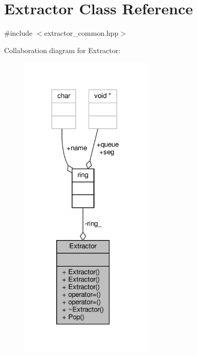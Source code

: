 \hypertarget{classExtractor}{}\section{Extractor Class Reference}
\label{classExtractor}


{\ttfamily \#include $<$extractor\+\_\+common.\+hpp$>$}



Collaboration diagram for Extractor\+:
\nopagebreak
\begin{figure}[H]
\begin{center}
\leavevmode
\includegraphics[width=179pt]{classExtractor__coll__graph}
\end{center}
\end{figure}
